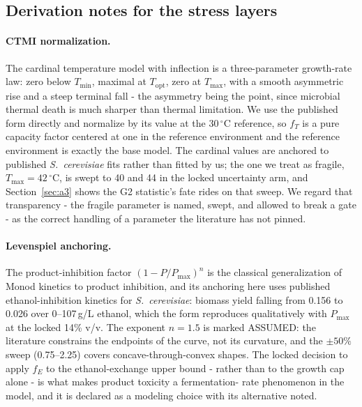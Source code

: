 \documentclass[12pt]{article}
\begin{document}
\subsection{Derivation notes for the stress layers}
\label{sec:derivations}

\paragraph{CTMI normalization.} The cardinal temperature model with
inflection is a three-parameter growth-rate law: zero below
$T_{\min}$, maximal at $T_{\mathrm{opt}}$, zero at $T_{\max}$, with a
smooth asymmetric rise and a steep terminal fall - the asymmetry being
the point, since microbial thermal death is much sharper than thermal
limitation. We use the published form directly and normalize by its
value at the 30\,$^{\circ}$C reference, so $f_T$ is a pure
capacity factor centered at one in the reference environment and the
reference environment is exactly the base model. The cardinal values
are anchored to published \emph{S.\ cerevisiae} fits rather than
fitted by us; the one we treat as fragile, $T_{\max}=42\,^{\circ}$C,
is swept to 40 and 44 in the locked uncertainty arm, and
Section~\ref{sec:a3} shows the G2 statistic's fate rides on that
sweep. We regard that transparency - the fragile parameter is named,
swept, and allowed to break a gate - as the correct handling of a
parameter the literature has not pinned.

\paragraph{Levenspiel anchoring.} The product-inhibition factor
$(1-P/P_{\max})^{n}$ is the classical generalization of Monod
kinetics to product inhibition, and its anchoring here uses published
ethanol-inhibition kinetics for \emph{S.\ cerevisiae}: biomass yield
falling from 0.156 to 0.026 over 0--107\,g/L ethanol, which the form
reproduces qualitatively with $P_{\max}$ at the locked 14\% v/v. The
exponent $n=1.5$ is marked ASSUMED: the literature constrains the
endpoints of the curve, not its curvature, and the $\pm 50\%$ sweep
(0.75--2.25) covers concave-through-convex shapes. The locked decision
to apply $f_E$ to the ethanol-exchange upper bound - rather than to
the growth cap alone - is what makes product toxicity a fermentation-
rate phenomenon in the model, and it is declared as a modeling choice
with its alternative noted.
\end{document}
